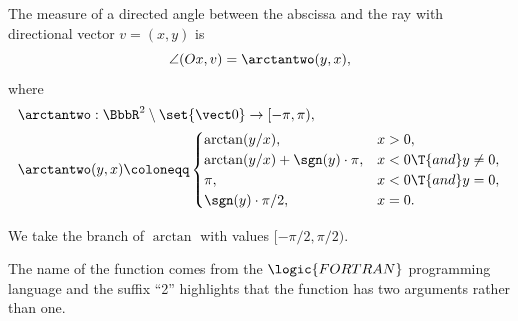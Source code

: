 \begin{proposition}\label{thm:arctantwo}
  The measure of a directed angle between the abscissa and the ray with directional vector \( v = (x, y) \) is
  \begin{equation}
    \angle(Ox, v) = \arctantwo(y, x),
  \end{equation}
  where
  \begin{equation*}
    \begin{aligned}
       &\arctantwo: \BbbR^2 \setminus \set{ \vect 0 } \to [-\pi, \pi), \\
       &\arctantwo(y, x) \coloneqq \begin{cases}
        \arctan(y / x),                     &x > 0, \\
        \arctan(y / x) + \sgn(y) \cdot \pi, &x < 0 \T{and} y \neq 0, \\
        \pi,                                     &x < 0 \T{and} y = 0, \\
        \sgn(y) \cdot \pi / 2,              &x = 0. \\
      \end{cases}
    \end{aligned}
  \end{equation*}

  We take the branch of \( \arctan \) with values \( [-\pi / 2, \pi / 2) \).

  The name of the function comes from the \( \logic{FORTRAN} \) programming language and the suffix \enquote{2} highlights that the function has two arguments rather than one.
\end{proposition}

